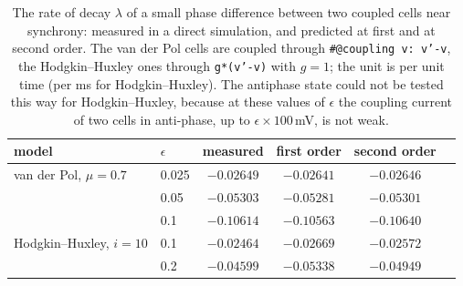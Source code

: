 \documentclass[11pt,a4paper]{article}
\begin{document}
\begin{table}[!htbp]
  \centering\small
  \begin{tabular}{@{}llcccc@{}}
    \toprule
    model & $\epsilon$ & measured & first order & second order \\
    \midrule
    van der Pol, $\mu=0.7$ & 0.025 & $-0.02649$ & $-0.02641$ & $-0.02646$ \\
     & 0.05 & $-0.05303$ & $-0.05281$ & $-0.05301$ \\
     & 0.1 & $-0.10614$ & $-0.10563$ & $-0.10640$ \\
    Hodgkin--Huxley, $i=10$ & 0.1 & $-0.02464$ & $-0.02669$ & $-0.02572$ \\
     & 0.2 & $-0.04599$ & $-0.05338$ & $-0.04949$ \\
    \bottomrule
  \end{tabular}
  \caption{The rate of decay $\lambda$ of a small phase difference between two coupled cells near synchrony: measured in a direct simulation, and predicted at first and at second order. The van der Pol cells are coupled through \texttt{\#@coupling v: v'-v}, the Hodgkin--Huxley ones through \texttt{g*(v'-v)} with $g=1$; the unit is per unit time (per ms for Hodgkin--Huxley). The antiphase state could not be tested this way for Hodgkin--Huxley, because at these values of $\epsilon$ the coupling current of two cells in anti-phase, up to $\epsilon\times100$\,mV, is not weak.}
  \label{tab:h2check}
\end{table}
\end{document}
